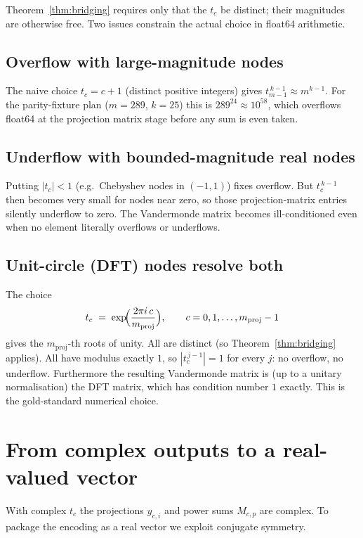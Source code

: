 \documentclass[a4paper,11pt]{article}
\begin{document}
Theorem~\ref{thm:bridging} requires only that the $t_c$ be distinct;
their magnitudes are otherwise free.  Two issues constrain the actual
choice in float64 arithmetic.

\subsection{Overflow with large-magnitude nodes}

The naive choice $t_c = c + 1$ (distinct positive integers) gives
$t_{m-1}^{\,k-1} \approx m^{k-1}$.  For the parity-fixture plan
($m = 289$, $k = 25$) this is $289^{24} \approx 10^{58}$, which
overflows float64 at the projection matrix stage before any sum is
even taken.

\subsection{Underflow with bounded-magnitude real nodes}

Putting $|t_c| < 1$ (e.g.\ Chebyshev nodes in $(-1, 1)$) fixes
overflow.  But $t_c^{\,k-1}$ then becomes very small for nodes near
zero, so those projection-matrix entries silently underflow to zero.
The Vandermonde matrix becomes ill-conditioned even when no element
literally overflows or underflows.

\subsection{Unit-circle (DFT) nodes resolve both}

The choice
\[
  t_c \;=\; \exp\!\Bigl(\frac{2\pi i\,c}{m_{\text{proj}}}\Bigr),
  \qquad c = 0, 1, \ldots, m_{\text{proj}} - 1
\]
gives the $m_{\text{proj}}$-th roots of unity.  All are distinct (so
Theorem~\ref{thm:bridging} applies).  All have modulus exactly $1$,
so $|t_c^{\,j-1}| = 1$ for every $j$: no overflow, no underflow.
Furthermore the resulting Vandermonde matrix is (up to a unitary
normalisation) the DFT matrix, which has condition number $1$
exactly.  This is the gold-standard numerical choice.

\section{From complex outputs to a real-valued vector}

With complex $t_c$ the projections $y_{c, i}$ and power sums $M_{c, p}$
are complex.  To package the encoding as a real vector we exploit
conjugate symmetry.
\end{document}
